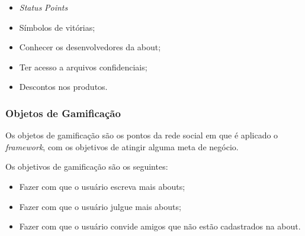 \begin{itemize}
    \item \textit{Status} \textit{Points}
    \item Símbolos de vitórias;
    \item Conhecer os desenvolvedores da about;
    \item Ter acesso a arquivos confidenciais;
    \item Descontos nos produtos.
\end{itemize}

\subsubsection{Objetos de Gamificação}
\label{sec:objetodegamificacao}
Os objetos de gamificação são os pontos da rede social em que é aplicado o \textit{framework},
com os objetivos de atingir alguma meta de negócio.

Os objetivos de gamificação são os seguintes:

\begin{itemize}
    \item Fazer com que o usuário escreva mais abouts;
    \item Fazer com que o usuário julgue mais abouts;
    \item Fazer com que o usuário convide amigos que não estão cadastrados na about.
\end{itemize}

